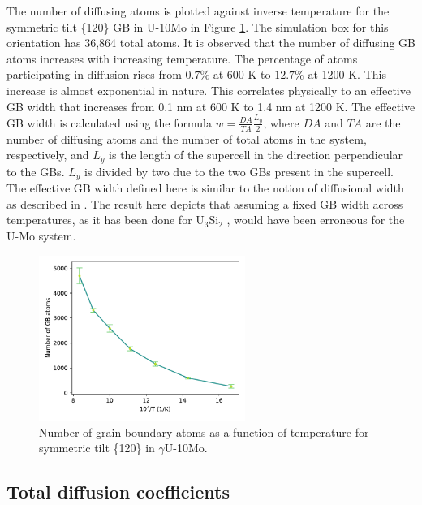 \documentclass{elsarticle}
\begin{document}
The number of diffusing atoms is plotted against inverse temperature for the symmetric tilt \{120\} GB in U-10Mo in Figure \ref{fig:atomVsT}. The simulation box for this orientation has 36,864 total atoms. It is observed that the number of diffusing GB atoms increases with increasing temperature. The percentage of atoms participating in diffusion rises from $0.7\%$ at 600 K to $12.7\%$ at 1200 K. This increase is almost exponential in nature. This correlates physically to an effective GB width that increases from 0.1 nm at 600 K to 1.4 nm at 1200 K. The effective GB width is calculated using the formula $w = \frac{DA}{TA} \frac{L_y}{2}$, where $DA$ and $TA$ are the number of diffusing atoms and the number of total atoms in the system, respectively, and $L_y$ is the length of the supercell in the direction perpendicular to the GBs. $L_y$ is divided by two due to the two GBs present in the supercell. The effective GB width defined here is similar to the notion of diffusional width as described in \cite{keblinski1999}. The result here depicts that assuming a fixed GB width across temperatures, as it has been done for U$_3$Si$_2$ \cite{cooper2021}, would have been erroneous for the U-Mo system.

\begin{figure}[!ht]
\centering
\includegraphics[width=0.60\textwidth]{atomsVsT.pdf}
\caption{Number of grain boundary atoms as a function of temperature for symmetric tilt \{120\} in $\gamma$U-10Mo.}
\label{fig:atomVsT}
\end{figure}


\FloatBarrier
\subsection{Total diffusion coefficients}
\end{document}
